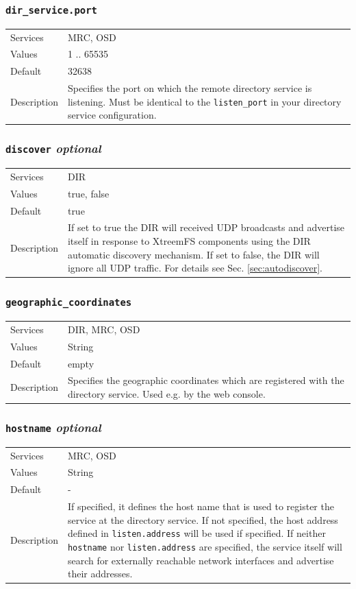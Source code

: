 \documentclass[a4paper,10pt]{book}
\begin{document}
\subsubsection{\texttt{dir\_service.port}}
\begin{tabular}{lp{10cm}}
 Services & MRC, OSD\\
 Values   & 1 .. 65535 \\
 Default  & 32638 \\
 Description & Specifies the port on which the remote directory service is listening. Must be identical to the \texttt{listen\_port} in your directory service configuration.
\end{tabular}

\subsubsection{\texttt{discover} \textit{optional}}
\begin{tabular}{lp{10cm}}
 Services & DIR\\
 Values   & true, false \\
 Default  & true \\
 Description & If set to true the DIR will received UDP broadcasts and advertise itself in response to XtreemFS components using the DIR automatic discovery mechanism. If set to false, the DIR will ignore all UDP traffic. For details see Sec. \ref{sec:autodiscover}.
\end{tabular}

\subsubsection{\texttt{geographic\_coordinates}}
\begin{tabular}{lp{10cm}}
 Services & DIR, MRC, OSD\\
 Values   & String \\
 Default  & empty \\
 Description & Specifies the geographic coordinates which are registered with the directory service. Used e.g. by the web console.
\end{tabular}

\subsubsection{\texttt{hostname} \textit{optional}}
\begin{tabular}{lp{10cm}}
 Services & MRC, OSD\\
 Values   & String \\
 Default  & -\\
 Description & If specified, it defines the host name that is used to register the service at the directory service. If not specified, the host address defined in \texttt{listen.address} will be used if specified. If neither \texttt{hostname} nor \texttt{listen.address} are specified, the service itself will search for externally reachable network interfaces and advertise their addresses.
\end{tabular}
\end{document}
